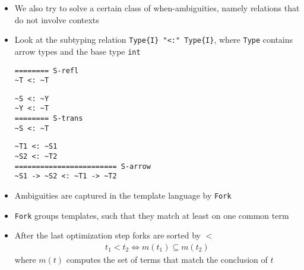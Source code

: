 \documentclass{beamer}
\begin{document}
\begin{frame}
\begin{itemize}
\item We also try to solve a certain class of when-ambiguities, namely
  relations that do not involve contexts
\item Look at the subtyping relation \verb|Type{I} "<:" Type{I}|,
  where \verb|Type| contains arrow types and the base type \verb|int|
  \begin{minipage}[b]{.4\linewidth}
\begin{lstlisting}[language=sltc]
======== S-refl
~T <: ~T
\end{lstlisting}
  \end{minipage}
  \begin{minipage}[b]{.4\linewidth}
\begin{lstlisting}[language=sltc]
~S <: ~Y
~Y <: ~T
======== S-trans
~S <: ~T
\end{lstlisting}
  \end{minipage}
  \begin{lstlisting}[language=sltc]
~T1 <: ~S1
~S2 <: ~T2
======================== S-arrow
~S1 -> ~S2 <: ~T1 -> ~T2
  \end{lstlisting}
\end{itemize}

\framebreak{}

\begin{itemize}
\item Ambiguities are captured in the template language by \verb|Fork|
\item \verb|Fork| groups templates, such that they match at least on
  one common term
\item After the last optimization step forks are sorted by $<$
  \begin{align}
    t_1 < t_2 \iff m(t_1) \subseteq m(t_2)
  \end{align}
  where $m(t)$ computes the set of terms that match the conclusion of $t$
\end{itemize}
\end{frame}

\renewcommand*\selectConstraintGeneration{orange}
\renewcommand*\selectConstraintGeneration{}
\end{document}

